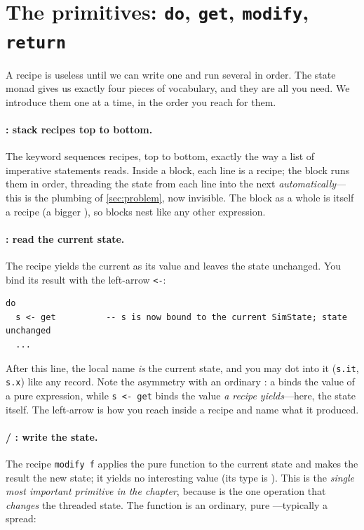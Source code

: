 \section{The primitives: \texttt{do}, \texttt{get}, \texttt{modify}, \texttt{return}}
\label{sec:primitives}

A recipe is useless until we can write one and run several in order. The state monad
gives us exactly four pieces of vocabulary, and they are all you need. We introduce
them one at a time, in the order you reach for them.

\paragraph{: stack recipes top to bottom.} The keyword  sequences
recipes, top to bottom, exactly the way a list of imperative statements reads. Inside
a  block, each line is a recipe; the block runs them in order, threading the
state from each line into the next \emph{automatically}---this is the plumbing of
\cref{sec:problem}, now invisible. The block as a whole is itself a recipe (a bigger
), so  blocks nest like any other expression.

\paragraph{: read the current state.} The recipe  yields the
current  as its value and leaves the state unchanged. You bind its
result with the left-arrow \lstinline[style=l4style]|<-|:

\begin{lstlisting}[style=l4style]
do
  s <- get          -- s is now bound to the current SimState; state unchanged
  ...
\end{lstlisting}

\noindent After this line, the local name  \emph{is} the current state, and
you may dot into it (\lstinline[style=l4style]|s.it|, \lstinline[style=l4style]|s.x|)
like any record. Note the asymmetry with an ordinary : a  binds
the value of a pure expression, while \lstinline[style=l4style]|s <- get| binds the
value \emph{a recipe yields}---here, the state itself. The left-arrow is how you reach
inside a recipe and name what it produced.

\paragraph{ / : write the state.} The recipe
\lstinline[style=l4style]|modify f| applies the pure function  to the current
state and makes the result the new state; it yields no interesting value (its type is
). This is the \emph{single most important primitive in the chapter},
because  is the one operation that \emph{changes} the threaded state.
The function  is an ordinary, pure ---typically a
spread:

